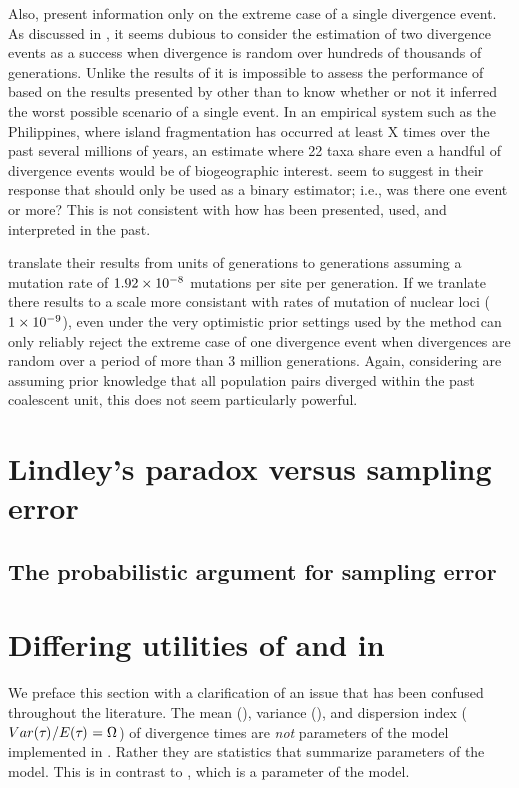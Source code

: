 \documentclass[letterpaper,12pt]{article}
\begin{document}
\begin{linenumbers}
Also, \citet{Hickerson2013} present information only on the extreme case of a
single divergence event.
As discussed in \citet{Oaks2012}, it seems dubious to consider the estimation
of two divergence events as a success when divergence is random over hundreds
of thousands of generations.
Unlike the results of \citet{Oaks2012} it is impossible to assess the
performance of \msb based on the results presented by \cite{Hickerson2013}
other than to know whether or not it inferred the worst possible scenario of a
single event.
In an empirical system such as the Philippines, where island fragmentation
has occurred at least X times over the past several millions of years, an
estimate where 22 taxa share even a handful of divergence events would be
of biogeographic interest.
\citet{Hickerson2013} seem to suggest in their response that \msb should only
be used as a binary estimator; i.e., was there one event or more?
This is not consistent with how \msb has been presented, used, and interpreted
in the past.

\citet{Hickerson2013} translate their results from units of
\globalcoalunit generations to generations assuming a mutation rate of
$1.92\times 10^{-8}$ mutations per site per generation.
If we tranlate there results to a scale more consistant with rates of mutation
of nuclear loci ($1\times 10^{-9}$), even under the very optimistic prior settings used
by \citet{Hickerson2013} the method can only reliably reject the extreme case
of one divergence event when divergences are random over a period of more than
3 million generations.
Again, considering \citet{Hickerson2013} are assuming prior knowledge that
all population pairs diverged within the past coalescent unit, this
does not seem particularly powerful.




\section*{Lindley's paradox versus sampling error}

\subsection*{The probabilistic argument for sampling error}



\section*{Differing utilities of \numt{} and \vmratio{} in \msb}
We preface this section with a clarification of an issue that has
been confused throughout the \msb literature.
The mean (\meant{}{}), variance (\vart{}{}), and dispersion index
($Var(\tau_{}{})_{}/E(\tau_{})_{} = \Omega_{}$) of divergence times are \emph{not} parameters
of the model implemented in \msb.
Rather they are statistics that summarize parameters of the model.
This is in contrast to \numt{}, which is a parameter of the model.


\end{linenumbers}
\end{document}
